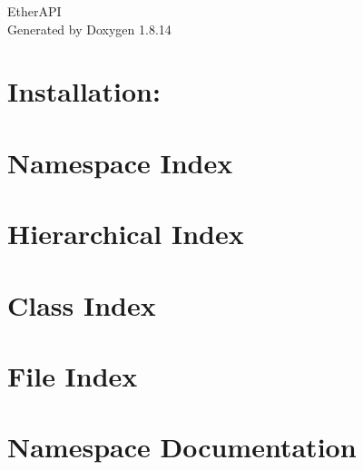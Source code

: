 \documentclass[twoside]{book}
\newcommand{\+}{\discretionary{\mbox{\scriptsize$\hookleftarrow$}}{}{}}
\newcommand{\clearemptydoublepage}{%
  \newpage{\pagestyle{empty}\cleardoublepage}%
}
\begin{document}
\hypersetup{pageanchor=false,
             bookmarksnumbered=true,
             pdfencoding=unicode
            }
\begin{titlepage}
\vspace*{7cm}
\begin{center}%
{\Large Ether\+A\+PI }\\
\vspace*{1cm}
{\large Generated by Doxygen 1.8.14}\\
\end{center}
\end{titlepage}
\clearemptydoublepage
{}
\tableofcontents
\clearemptydoublepage
{}
\hypersetup{pageanchor=true}

\chapter{Installation\+:}
\label{md__c_1__lyn_tmp_ethernom-api-master_10-31-19__r_e_a_d_m_e}

\chapter{Namespace Index}

\chapter{Hierarchical Index}

\chapter{Class Index}

\chapter{File Index}

\chapter{Namespace Documentation}





\end{document}
